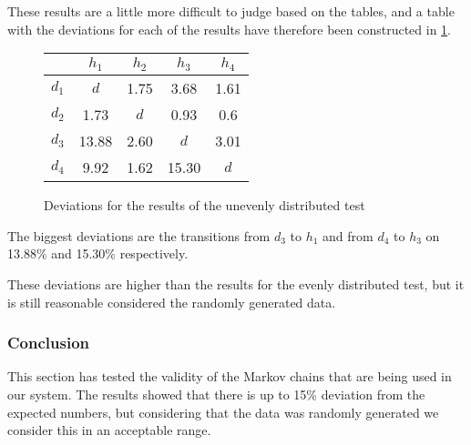 These results are a little more difficult to judge based on the tables, and a table with the deviations for each of the results have therefore been constructed in \cref{deviations}.

\begin{figure}
	\centering
	\begin{tabular}{ | c | c c c c |}
	\hline
	& $ h_1 $ & $ h_2 $ & $ h_3 $ & $ h_4 $\\
	\hline
	$ d_1 $ & $ d $ & 1.75 & 3.68 & 1.61\\
	$ d_2 $ & 1.73 & $ d $ & 0.93 & 0.6\\
	$ d_3 $ & 13.88 & 2.60 & $ d $ & 3.01 \\
	$ d_4 $ & 9.92 & 1.62 & 15.30 & $ d $\\
	\hline
\end{tabular}
\caption{Deviations for the results of the unevenly distributed test} \label{deviations}
\end{figure}

The biggest deviations are the transitions from $ d_3 $ to $ h_1 $ and from $ d_4 $ to $ h_3 $ on 13.88\% and 15.30\% respectively.

These deviations are higher than the results for the evenly distributed test, but it is still reasonable considered the randomly generated data.

\subsubsection{Conclusion}
This section has tested the validity of the Markov chains that are being used in our system.
The results showed that there is up to 15\% deviation from the expected numbers, but considering that the data was randomly generated we consider this in an acceptable range.
